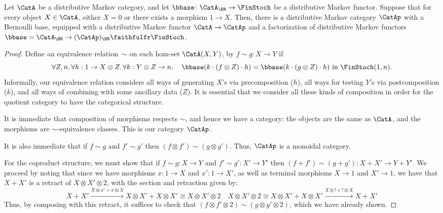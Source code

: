 \begin{proposition}\label{prop:quotient}
Let $\CatA$ be a distributive Markov category, and let $\bbase\colon
\CatA_\NN\to \FinStoch$ be a distributive Markov functor.
Suppose that for every object $X\in\CatA$, either $X=0$ or there
exists a morphism $1\to X$. 
Then, there is a distributive Markov category $\CatAp$ with a Bernoulli base, equipped with 
a distributive Markov functor $\CatA\to \CatAp$ and a factorization of distributive Markov functors
$\bbase=\CatA_\NN\to (\CatAp)_\NN\faithfulfr \FinStoch$.
\end{proposition}
\begin{proof}
  Define an equivalence relation~$\sim$ on each hom-set $\CatA(X,Y)$,
  by $f\sim g:X\to Y$ if 
  \[
    \forall Z,n.\,\forall h:1\to X\otimes Z.\,\forall k:Y\otimes Z\to
    n.\,
    \quad
    \bbase(k\cdot (f\otimes Z)\cdot h)=
    \bbase(k\cdot (g\otimes Z)\cdot h)
    \text{ in }\FinStoch(1,n)\text.
  \]
  Informally, our equivalence relation considers all ways of generating $X$'s
  via precomposition ($h$),  all ways for testing $Y$'s via postcomposition ($k$), and all ways of combining with some ancillary data ($Z$).
  It is essential that we consider all these kinds of composition in order for the quotient category to have the categorical structure. 
  
  It is immediate that composition of morphisms respects $\sim$,
  and hence we have a category: the objects are the same as $\CatA$,
  and the morphisms are $\sim$-equivalence classes. This is our category $\CatAp$.

  It is also immediate that if $f\sim g$ and $f'\sim
  g'$ then $(f\otimes f')\sim(g\otimes g')$. Thus, $\CatAp$ is a
  monoidal category. 

  For the coproduct structure, we must show that if $f\sim g:X\to Y$ and
  $f'\sim g':X'\to Y'$ then $(f+f')\sim (g+g'):X+X'\to Y+Y'$.
  We proceed by noting that since we have morphisms
  $x:1\to X$ and $x':1\to X'$, as well as terminal morphisms $X\to 1$ and
  $X'\to 1$, we have that $X+X'$ is a retract of $X\otimes X'\otimes
  2$, with the section and retraction given by:
  \[
    X + X'\xrightarrow{X\otimes x'+x\otimes X} X\otimes X' + X\otimes
    X'\cong X\otimes X'\otimes 2
    \quad
     X\otimes X'\otimes 2\cong
    X\otimes X' + X\otimes X'
    \xrightarrow{X\otimes !+!\otimes X}
    X + X'
  \]
  Thus, by composing with this retract, it suffices to check that
  $(f\otimes f'\otimes 2)\sim (g\otimes g'\otimes 2)$,
  which we have already shown.


\end{proof}
